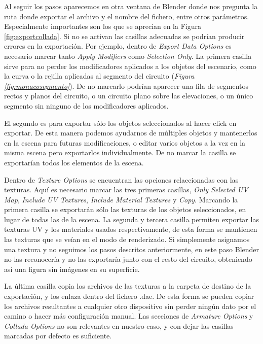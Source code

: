 Al seguir los pasos aparecemos en otra ventana de Blender donde nos pregunta la ruta donde exportar el archivo y el nombre del fichero, entre otros parámetros. Especialmente importantes son los que se aprecian en la Figura \ref{fig:exportcollada}. Si no se activan las casillas adecuadas se podrían producir errores en la exportación. Por ejemplo, dentro de \textit{Export Data Options} es necesario marcar tanto \textit{Apply Modifiers} como \textit{Selection Only}. La primera casilla sirve para no perder los modificadores aplicados a los objetos del escenario, como la curva o la rejilla aplicadas al segmento del circuito (\textit{Figura \ref{fig:monacosegmento}}). De no marcarlo podrían aparecer una fila de segmentos rectos y planos del circuito, o un circuito plano sobre las elevaciones, o un único segmento sin ninguno de los modificadores aplicados. 

El segundo es para exportar sólo los objetos seleccionados al hacer click en exportar. De esta manera podemos ayudarnos de múltiples objetos y mantenerlos en la escena para futuras modificaciones, o editar varios objetos a la vez en la misma escena pero exportarlos individualmente. De no marcar la casilla se exportarían todos los elementos de la escena. 

Dentro de \textit{Texture Options} se encuentran las opciones relaccionadas con las texturas. Aquí es necesario marcar las tres primeras casillas, \textit{Only Selected UV Map}, \textit{Include UV Textures}, \textit{Include Material Textures} y \textit{Copy}. Marcando la primera casilla se exportarán sólo las texturas de los objetos seleccionados, en lugar de todas las de la escena. La segunda y tercera casilla permiten exportar las texturas UV y los materiales usados respectivamente, de esta forma se mantienen las texturas que se veían en el modo de renderizado. Si simplemente asignamos una textura y no seguimos los pasos descritos anteriormente, en este paso Blender no las reconocería y no las exportaría junto con el resto del circuito, obteniendo así una figura sin imágenes en su superficie. 

La última casilla copia los archivos de las texturas a la carpeta de destino de la exportación, y los enlaza dentro del fichero .dae. De esta forma se pueden copiar los archivos resultantes a cualquier otro dispositivo sin perder ningún dato por el camino o hacer más configuración manual. Las secciones de \textit{Armature Options} y \textit{Collada Options} no son relevantes en nuestro caso, y con dejar las casillas marcadas por defecto es suficiente.

